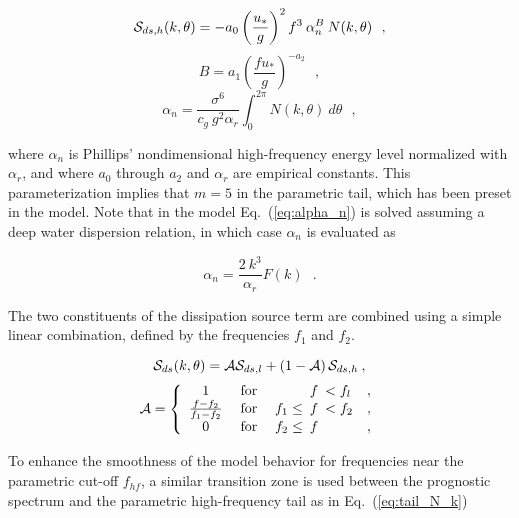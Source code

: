 \begin{equation}
{\cal S}_{ds,h}(k,\theta) = - a_0 \left ( \frac{u_\ast}{g} \right ) ^2  f^3 \:
\alpha_n^B \: N(k,\theta) \:\:\: , \label{eq:TCdh}
\end{equation} \begin{displaymath}
B = a_1 \left( \frac{ f u_\ast}{g} \right ) ^{-a_2}
\:\:\: , \end{displaymath} \begin{equation}
\alpha_n = \frac{\sigma^6}{c_g \: g^2 \alpha_r} \int_0^{2\pi} N(k,\theta) \: d\theta
\:\:\: , \label{eq:alpha_n} \end{equation}

\noindent
where $\alpha_n$ is Phillips' nondimensional high-frequency energy level
normalized with $\alpha_r$, and where $a_0$ through $a_2$ and $\alpha_r$ are
empirical constants. This parameterization implies that $m = 5$ in the
parametric tail, which has been preset in the model. Note that in the model
Eq.~(\ref{eq:alpha_n}) is solved assuming a deep water dispersion relation, in
which case $\alpha_n$ is evaluated as

\begin{equation}
\alpha_n = \frac{2 \: k^3}{\alpha_r}  F(k)
\:\:\: . \label{eq:alpha_n_mod} \end{equation}

\noindent
The two constituents of the dissipation source term are combined using a
simple linear combination, defined by the frequencies $f_1$ and $f_2$.


\begin{equation}
{\cal S}_{ds}(k,\theta) = {\cal{A}} {\cal S}_{ds,l} +
\left ( 1 - {\cal{A}} \right ) {\cal S}_{ds,h}
\: , \label{eq:TCdtot} \end{equation} \begin{equation}
{\cal A} = \left \{ \begin{array}{ccrclc}
  1  & \;{\rm for}\; &          &\!\!\!f& \!\!\! < f_l & ,\\
\frac{ f-f_2}{f_1-f_2}
     & \;{\rm for}\; & f_1 \leq &\!\!\!f& \!\!\! < f_2 & ,\\
  0  & \;{\rm for}\; & f_2 \leq &\!\!\!f&              & ,
\end{array} \right . \label{eq:filt_A} \end{equation}

\noindent
To enhance the smoothness of the model behavior for frequencies near the
parametric cut-off $f_{hf}$, a similar transition zone is used between the
prognostic spectrum and the parametric high-frequency tail as in
Eq.~(\ref{eq:tail_N_k})

